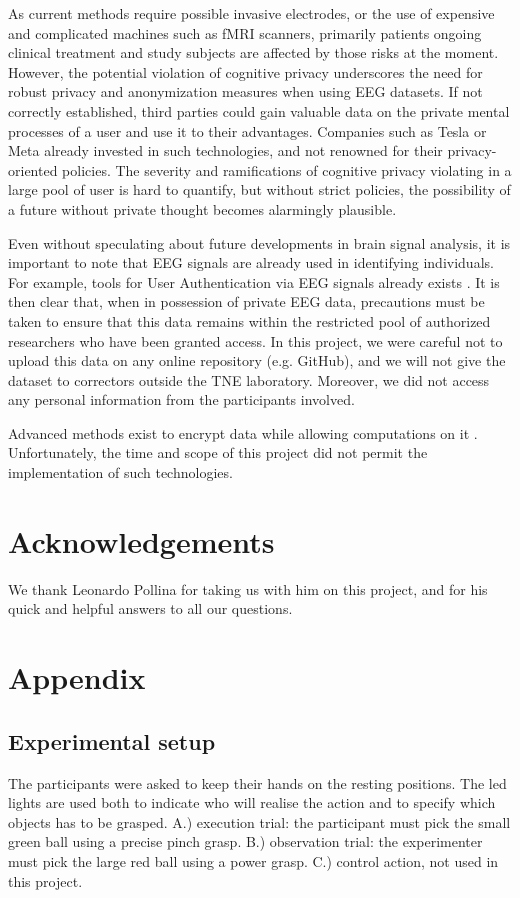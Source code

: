 \documentclass[10pt,conference,compsocconf]{IEEEtran}
\begin{document}
As current methods require possible invasive electrodes, or the use of expensive and complicated machines such as fMRI scanners, primarily patients ongoing clinical treatment and study subjects are affected by those risks at the moment. However, the potential violation of cognitive privacy underscores the need for robust privacy and anonymization measures when using EEG datasets. If not correctly established, third parties could gain valuable data on the private mental processes of a user and use it to their advantages. Companies such as Tesla or Meta already invested in such technologies, and not renowned for their privacy-oriented policies. The severity and ramifications of cognitive privacy violating in a large pool of user is hard to quantify, but without strict policies, the possibility of a future without private thought becomes alarmingly plausible.

Even without speculating about future developments in brain signal analysis, it is important to note that EEG signals are already used in identifying individuals. For example, tools for User Authentication via EEG signals already exists \cite{10058960}. It is then clear that, when in possession of private EEG data, precautions must be taken to ensure that this data remains within the restricted pool of authorized researchers who have been granted access. In this project, we were careful not to upload this data on any online repository (e.g. GitHub), and we will not give the dataset to correctors outside the TNE laboratory. Moreover, we did not access any personal information from the participants involved.

Advanced methods exist to encrypt data while allowing computations on it \cite{app11167360}. Unfortunately, the time and scope of this project did not permit the implementation of such technologies.


\section*{Acknowledgements}
We thank Leonardo Pollina for taking us with him on this project, and for his quick and helpful answers to all our questions.

\newpage

\section{Appendix}
\subsection{Experimental setup}
\label{subsec:expsetup}
The participants were asked to keep their hands on the resting positions. The led lights are used both to indicate who will realise the action and to specify which objects has to be grasped. A.) execution trial: the participant must pick the small green ball using a precise pinch grasp. B.) observation trial: the experimenter must pick the large red ball using a power grasp. C.) control action, not used in this project.
\end{document}
